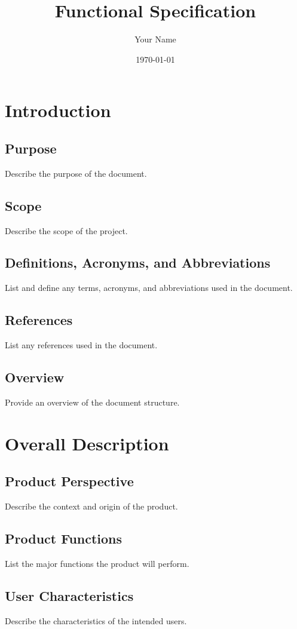 \documentclass[a4paper,12pt]{article}
\title{Functional Specification}
\author{Your Name}
\date{\today}
\begin{document}
\maketitle

\tableofcontents

\section{Introduction}
\subsection{Purpose}
Describe the purpose of the document.

\subsection{Scope}
Describe the scope of the project.

\subsection{Definitions, Acronyms, and Abbreviations}
List and define any terms, acronyms, and abbreviations used in the document.

\subsection{References}
List any references used in the document.

\subsection{Overview}
Provide an overview of the document structure.

\section{Overall Description}
\subsection{Product Perspective}
Describe the context and origin of the product.

\subsection{Product Functions}
List the major functions the product will perform.

\subsection{User Characteristics}
Describe the characteristics of the intended users.
\end{document}
